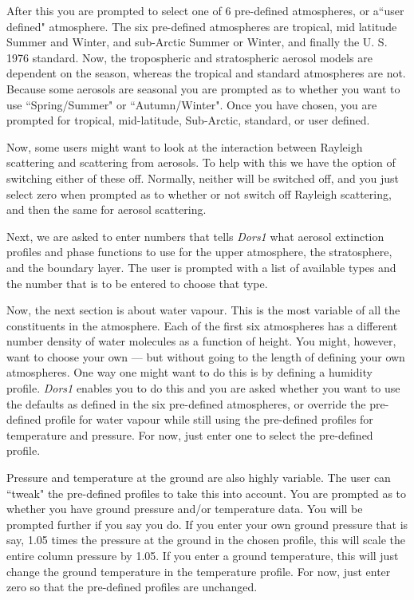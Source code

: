 \documentclass[12pt]{article}
\begin{document}
After this you are prompted to select one of 6 pre-defined atmospheres, or a``user defined" atmosphere.
The six pre-defined atmospheres  are tropical, mid latitude Summer and Winter, and 
sub-Arctic Summer or Winter, and finally
the U. S. 1976 standard. 
Now, the tropospheric and stratospheric aerosol models are 
dependent on the season, whereas the tropical and standard atmospheres are not. 
Because some aerosols are seasonal you are prompted as to whether you want to use
 ``Spring/Summer" or ``Autumn/Winter". 
Once you have chosen, you are prompted for tropical, mid-latitude, Sub-Arctic, standard,
 or user defined.

Now, some users might want to look at the interaction 
 between Rayleigh scattering and scattering from aerosols. To help with this we have the option
of switching either of these off. Normally, neither will be switched off, and you just select
zero when prompted as to  whether or not switch off Rayleigh scattering, and then the same
 for aerosol scattering.

Next, we are asked to enter numbers that tells {\it Dors1} what aerosol extinction profiles
and phase functions to use for the upper atmosphere, the stratosphere, and the boundary layer.
The user is prompted with a list of available types and the number that is to be entered to
choose that type.

Now, the next section is about water vapour. This is the most variable of all the
constituents in the atmosphere.  Each of the first six atmospheres has a different number
density of water molecules as a function of height. You might, however, want to choose your
own --- but  without going to the length of defining your own atmospheres.  One way one 
might want to do this is by defining a humidity profile. {\it Dors1} enables you to do 
this and you are asked whether you want to use the defaults as defined in the six pre-defined
atmospheres, or override the pre-defined profile for water vapour while still using
the pre-defined profiles for temperature and pressure. For now, just enter one to select the
pre-defined profile.

Pressure and temperature at the ground are also highly variable. The user can ``tweak" the
pre-defined profiles to take this into account. You are prompted as to whether you have ground pressure
and/or temperature data. You will be prompted further if you say you do. If you enter
your own ground pressure that is say, 1.05 times the pressure at the ground
in the chosen profile, this will scale the entire column pressure by 1.05. If you enter a ground
temperature, this will just change the ground temperature in the temperature profile. For now, just
enter zero so that the pre-defined profiles are unchanged.
\end{document}
